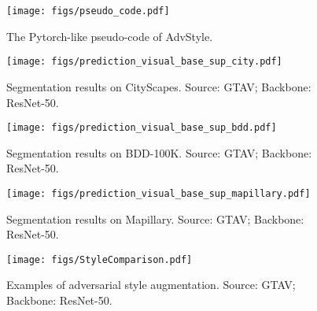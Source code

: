 \documentclass{article}
\newcommand{\ours}{AdvStyle\xspace}
\begin{document}
\begin{figure}[!ht]
\centering
\texttt{[image: figs/pseudo\_code.pdf]}
\caption{The Pytorch-like pseudo-code of \ours.}
\label{fig:pseudo_code}
\end{figure}


\begin{figure}[!ht]
\centering
\texttt{[image: figs/prediction\_visual\_base\_sup\_city.pdf]}
\vspace{-.1in}
\caption{Segmentation results on CityScapes. Source: GTAV; Backbone: ResNet-50.}
\label{fig:seg_city}
\end{figure}


\begin{figure}[!ht]
\centering
\texttt{[image: figs/prediction\_visual\_base\_sup\_bdd.pdf]}
\vspace{-.1in}
\caption{Segmentation results on BDD-100K. Source: GTAV; Backbone: ResNet-50.}
\label{fig:seg_bdd}
\end{figure}


\begin{figure}[!ht]
\centering
\texttt{[image: figs/prediction\_visual\_base\_sup\_mapillary.pdf]}
\vspace{-.1in}
\caption{Segmentation results on Mapillary. Source: GTAV; Backbone: ResNet-50.}
\label{fig:seg_maphillary}
\end{figure}



\begin{figure}[!ht]
\centering
\texttt{[image: figs/StyleComparison.pdf]}
\vspace{-.1in}
\caption{Examples of adversarial style augmentation. Source: GTAV; Backbone: ResNet-50.}
\label{fig:style_comparsison}
\end{figure}
\end{document}
